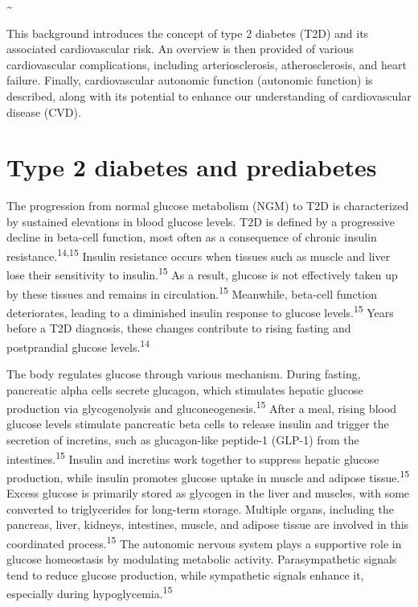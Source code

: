 \documentclass[
  a4paper,
  headsepline=true,
  open=any]{scrbook}
\begin{document}
\newpage

\thispagestyle{empty}

\textasciitilde{} \newpage

This background introduces the concept of type 2 diabetes (T2D) and its
associated cardiovascular risk. An overview is then provided of various
cardiovascular complications, including arteriosclerosis,
atherosclerosis, and heart failure. Finally, cardiovascular autonomic
function (autonomic function) is described, along with its potential to
enhance our understanding of cardiovascular disease (CVD).

\hypertarget{type-2-diabetes-and-prediabetes}{%
\section{Type 2 diabetes and
prediabetes}\label{type-2-diabetes-and-prediabetes}}

The progression from normal glucose metabolism (NGM) to T2D is
characterized by sustained elevations in blood glucose levels. T2D is
defined by a progressive decline in beta-cell function, most often as a
consequence of chronic insulin resistance.\textsuperscript{14,15}
Insulin resistance occurs when tissues such as muscle and liver lose
their sensitivity to insulin.\textsuperscript{15} As a result, glucose
is not effectively taken up by these tissues and remains in
circulation.\textsuperscript{15} Meanwhile, beta-cell function
deteriorates, leading to a diminished insulin response to glucose
levels.\textsuperscript{15} Years before a T2D diagnosis, these changes
contribute to rising fasting and postprandial glucose
levels.\textsuperscript{14}

The body regulates glucose through various mechanism. During fasting,
pancreatic alpha cells secrete glucagon, which stimulates hepatic
glucose production via glycogenolysis and
gluconeogenesis.\textsuperscript{15} After a meal, rising blood glucose
levels stimulate pancreatic beta cells to release insulin and trigger
the secretion of incretins, such as glucagon-like peptide-1 (GLP-1) from
the intestines.\textsuperscript{15} Insulin and incretins work together
to suppress hepatic glucose production, while insulin promotes glucose
uptake in muscle and adipose tissue.\textsuperscript{15} Excess glucose
is primarily stored as glycogen in the liver and muscles, with some
converted to triglycerides for long-term storage. Multiple organs,
including the pancreas, liver, kidneys, intestines, muscle, and adipose
tissue are involved in this coordinated process.\textsuperscript{15} The
autonomic nervous system plays a supportive role in glucose homeostasis
by modulating metabolic activity. Parasympathetic signals tend to reduce
glucose production, while sympathetic signals enhance it, especially
during hypoglycemia.\textsuperscript{15}
\end{document}

